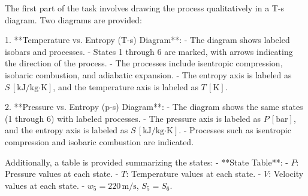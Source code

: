 The first part of the task involves drawing the process qualitatively in a T-s diagram. Two diagrams are provided:  

1. **Temperature vs. Entropy (T-s) Diagram**:  
   - The diagram shows labeled isobars and processes.  
   - States 1 through 6 are marked, with arrows indicating the direction of the process.  
   - The processes include isentropic compression, isobaric combustion, and adiabatic expansion.  
   - The entropy axis is labeled as \( S \, [\text{kJ}/\text{kg·K}] \), and the temperature axis is labeled as \( T \, [\text{K}] \).  

2. **Pressure vs. Entropy (p-s) Diagram**:  
   - The diagram shows the same states (1 through 6) with labeled processes.  
   - The pressure axis is labeled as \( P \, [\text{bar}] \), and the entropy axis is labeled as \( S \, [\text{kJ}/\text{kg·K}] \).  
   - Processes such as isentropic compression and isobaric combustion are indicated.  

Additionally, a table is provided summarizing the states:  
- **State Table**:  
  - \( P \): Pressure values at each state.  
  - \( T \): Temperature values at each state.  
  - \( V \): Velocity values at each state.  
  - \( w_5 = 220 \, \text{m/s} \), \( S_5 = S_6 \).